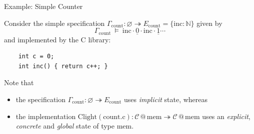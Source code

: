 \documentclass[aspectratio=1610,mathserif]{beamer}
\newcommand{\kw}[1]{\ensuremath{ \mathrm{#1} }}
\begin{document}
%
%

\begin{frame}[fragile]{Example: Simple Counter} %
  \begin{example}
    Consider the simple specification
    $\Gamma_\kw{count} : \varnothing \twoheadrightarrow E_\kw{count} = \{ \kw{inc} : \mathbb{N} \}$
    given by
    \[
      \Gamma_\kw{count} \: \vDash \: \kw{inc} \cdot \underline{0} \cdot \kw{inc} \cdot
         \underline{1} \cdots
    \]
    and implemented by the C library:
  \begin{verbatim}
    int c = 0;
    int inc() { return c++; }
\end{verbatim}
  \end{example}

 \pause
  Note that
  \begin{itemize}
  \item the specification $\Gamma_\kw{count} : \varnothing \twoheadrightarrow E_\kw{count}$
  uses \emph{implicit} state, whereas
  \item
  the implementation $\kw{Clight}(\kw{count.c}) : \mathcal{C} \mathbin@ \kw{mem}
     \twoheadrightarrow \mathcal{C} \mathbin@ \kw{mem}$
    uses
     an \emph{explicit}, \emph{concrete} and \emph{global} state of type  $\kw{mem}$.
  \end{itemize}
\end{frame}
\end{document}
